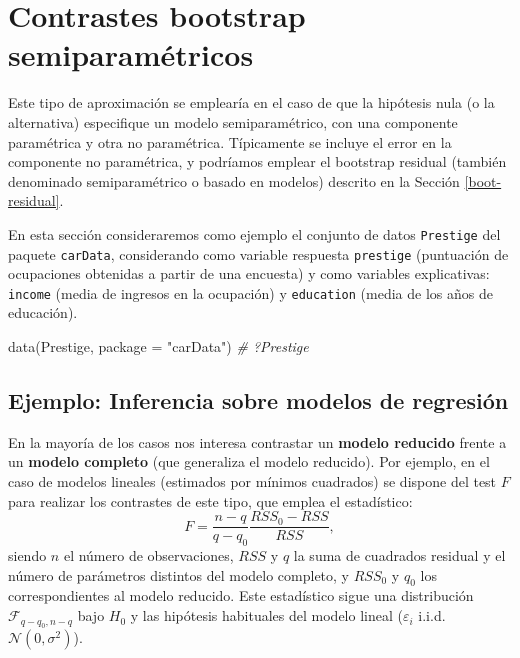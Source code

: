 \documentclass[
]{book}
\newenvironment{Shaded}{\begin{snugshade}}{\end{snugshade}}
\newcommand{\AttributeTok}[1]{\textcolor[rgb]{0.77,0.63,0.00}{#1}}
\newcommand{\CommentTok}[1]{\textcolor[rgb]{0.56,0.35,0.01}{\textit{#1}}}
\newcommand{\FunctionTok}[1]{\textcolor[rgb]{0.00,0.00,0.00}{#1}}
\newcommand{\NormalTok}[1]{#1}
\newcommand{\StringTok}[1]{\textcolor[rgb]{0.31,0.60,0.02}{#1}}
\theoremstyle{break}
\theoremstyle{definition}
\theoremstyle{definition}
\theoremstyle{definition}
\theoremstyle{definition}
\theoremstyle{remark}
\begin{document}
\hypertarget{contrastes-semiparametricos}{%
\section{Contrastes bootstrap semiparamétricos}\label{contrastes-semiparametricos}}

Este tipo de aproximación se emplearía en el caso de que la hipótesis nula
(o la alternativa) especifique un modelo semiparamétrico,
con una componente paramétrica y otra no paramétrica.
Típicamente se incluye el error en la componente no paramétrica, y podríamos emplear
el bootstrap residual (también denominado semiparamétrico o basado en modelos)
descrito en la Sección \ref{boot-residual}.

En esta sección consideraremos como ejemplo el conjunto de datos \texttt{Prestige}
del paquete \texttt{carData}, considerando como variable respuesta \texttt{prestige}
(puntuación de ocupaciones obtenidas a partir de una encuesta)
y como variables explicativas: \texttt{income} (media de ingresos en la ocupación)
y \texttt{education} (media de los años de educación).

\begin{Shaded}
\begin{Highlighting}[]
\FunctionTok{data}\NormalTok{(Prestige, }\AttributeTok{package =} \StringTok{"carData"}\NormalTok{)}
\CommentTok{\# ?Prestige}
\end{Highlighting}
\end{Shaded}

\hypertarget{ejemplo-inferencia-sobre-modelos-de-regresiuxf3n}{%
\subsection{Ejemplo: Inferencia sobre modelos de regresión}\label{ejemplo-inferencia-sobre-modelos-de-regresiuxf3n}}

En la mayoría de los casos nos interesa contrastar un \textbf{modelo reducido}
frente a un \textbf{modelo completo} (que generaliza el modelo reducido).
Por ejemplo, en el caso de modelos lineales (estimados por mínimos cuadrados)
se dispone del test \(F\) para realizar los contrastes de este tipo,
que emplea el estadístico:
\[F=\frac{n - q}{q - q_0}\frac{RSS_0 - RSS}{RSS},\]
siendo \(n\) el número de observaciones, \(RSS\) y \(q\) la suma de cuadrados residual y
el número de parámetros distintos del modelo completo,
y \(RSS_0\) y \(q_0\) los correspondientes al modelo reducido.
Este estadístico sigue una distribución \(\mathcal{F}_{q - q_0, n - q}\)
bajo \(H_0\) y las hipótesis habituales del modelo lineal
(\(\varepsilon_i\) i.i.d. \(\mathcal{N}(0, \sigma^2)\)).
\end{document}
